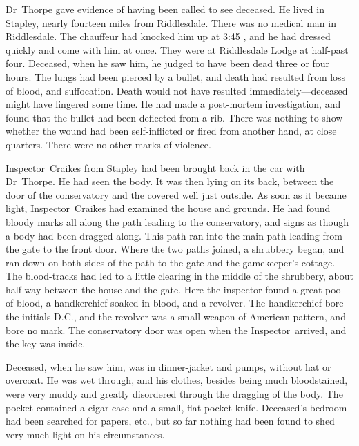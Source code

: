 Dr~Thorpe gave evidence of having been called to see deceased. He lived in Stapley, nearly fourteen miles from Riddlesdale. There was no medical man in Riddlesdale. The chauffeur had knocked him up at 3:45 , and he had dressed quickly and come with him at once. They were at Riddlesdale Lodge at half-past four. Deceased, when he saw him, he judged to have been dead three or four hours. The lungs had been pierced by a bullet, and death had resulted from loss of blood, and suffocation. Death would not have resulted immediately—deceased might have lingered some time. He had made a post-mortem investigation, and found that the bullet had been deflected from a rib. There was nothing to show whether the wound had been self-inflicted or fired from another hand, at close quarters. There were no other marks of violence.

Inspector~Craikes from Stapley had been brought back in the car with Dr~Thorpe. He had seen the body. It was then lying on its back, between the door of the conservatory and the covered well just outside.  As soon as it became light, Inspector~Craikes had examined the house and grounds. He had found bloody marks all along the path leading to the conservatory, and signs as though a body had been dragged along.  This path ran into the main path leading from the gate to the front door.  Where the two paths joined, a shrubbery began, and ran down on both sides of the path to the gate and the gamekeeper's cottage. The blood-tracks had led to a little clearing in the middle of the shrubbery, about half-way between the house and the gate. Here the inspector found a great pool of blood, a handkerchief soaked in blood, and a revolver. The handkerchief bore the initials D\@.C\@., and the revolver was a small weapon of American pattern, and bore no mark.  The conservatory door was open when the Inspector~arrived, and the key was inside.

Deceased, when he saw him, was in dinner-jacket and pumps, without hat or overcoat. He was wet through, and his clothes, besides being much bloodstained, were very muddy and greatly disordered through the dragging of the body. The pocket contained a cigar-case and a small, flat pocket-knife. Deceased's bedroom had been searched for papers, etc., but so far nothing had been found to shed very much light on his circumstances.

